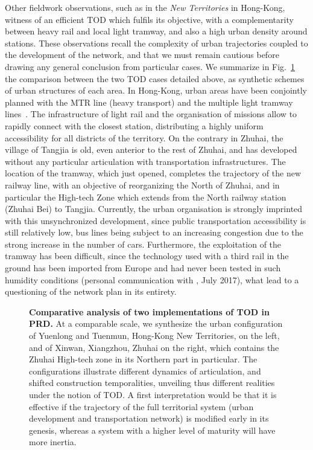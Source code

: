Other fieldwork observations, such as in the \emph{New Territories} in Hong-Kong, witness of an efficient TOD which fulfils its objective, with a complementarity between heavy rail and local light tramway, and also a high urban density around stations. These observations recall the complexity of urban trajectories coupled to the development of the network, and that we must remain cautious before drawing any general conclusion from particular cases. We summarize in Fig.~\ref{fig:qualitative:schema} the comparison between the two TOD cases detailed above, as synthetic schemes of urban structures of each area. In Hong-Kong, urban areas have been conjointly planned with the MTR line (heavy transport) and the multiple light tramway lines~\citep{hui2005study}. The infrastructure of light rail and the organisation of missions allow to rapidly connect with the closest station, distributing a highly uniform accessibility for all districts of the territory. On the contrary in Zhuhai, the village of Tangjia is old, even anterior to the rest of Zhuhai, and has developed without any particular articulation with transportation infrastructures. The location of the tramway, which just opened, completes the trajectory of the new railway line, with an objective of reorganizing the North of Zhuhai, and in particular the High-tech Zone which extends from the North railway station (Zhuhai Bei) to Tangjia. Currently, the urban organisation is strongly imprinted with this unsynchronized development, since public transportation accessibility is still relatively low, bus lines being subject to an increasing congestion due to the strong increase in the number of cars. Furthermore, the exploitation of the tramway has been difficult, since the technology used with a third rail in the ground has been imported from Europe and had never been tested in such humidity conditions (personal communication with , July 2017), what lead to a questioning of the network plan in its entirety. 



\begin{figure}
	\caption{\textbf{Comparative analysis of two implementations of TOD in PRD.} At a comparable scale, we synthesize the urban configuration of Yuenlong and Tuenmun, Hong-Kong New Territories, on the left, and of Xinwan, Xiangzhou, Zhuhai on the right, which contains the Zhuhai High-tech zone in its Northern part in particular. The configurations illustrate different dynamics of articulation, and shifted construction temporalities, unveiling thus different realities under the notion of TOD. A first interpretation would be that it is effective if the trajectory of the full territorial system (urban development and transportation network) is modified early in its genesis, whereas a system with a higher level of maturity will have more inertia.\label{fig:qualitative:schema}}
\end{figure}



